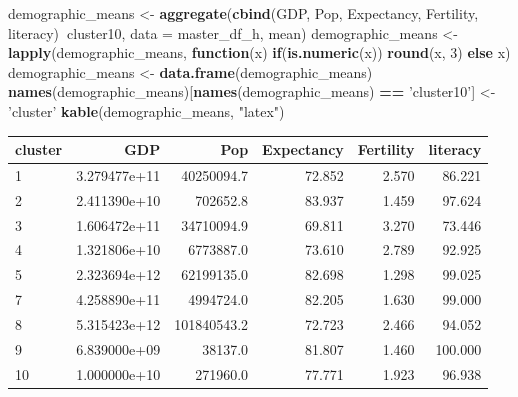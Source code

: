\documentclass[]{article}
\newenvironment{Shaded}{\begin{snugshade}}{\end{snugshade}}
\newcommand{\ControlFlowTok}[1]{\textcolor[rgb]{0.13,0.29,0.53}{\textbf{#1}}}
\newcommand{\DataTypeTok}[1]{\textcolor[rgb]{0.13,0.29,0.53}{#1}}
\newcommand{\DecValTok}[1]{\textcolor[rgb]{0.00,0.00,0.81}{#1}}
\newcommand{\KeywordTok}[1]{\textcolor[rgb]{0.13,0.29,0.53}{\textbf{#1}}}
\newcommand{\NormalTok}[1]{#1}
\newcommand{\OperatorTok}[1]{\textcolor[rgb]{0.81,0.36,0.00}{\textbf{#1}}}
\newcommand{\StringTok}[1]{\textcolor[rgb]{0.31,0.60,0.02}{#1}}
\begin{document}
\begin{Shaded}
\begin{Highlighting}[]
\NormalTok{demographic_means <-}\StringTok{ }\KeywordTok{aggregate}\NormalTok{(}\KeywordTok{cbind}\NormalTok{(GDP, Pop, Expectancy, Fertility, literacy)}\OperatorTok{~}\NormalTok{cluster10, }
                               \DataTypeTok{data =}\NormalTok{ master_df_h, mean)}
\NormalTok{demographic_means <-}\StringTok{ }\KeywordTok{lapply}\NormalTok{(demographic_means, }\ControlFlowTok{function}\NormalTok{(x) }\ControlFlowTok{if}\NormalTok{(}\KeywordTok{is.numeric}\NormalTok{(x)) }\KeywordTok{round}\NormalTok{(x, }\DecValTok{3}\NormalTok{) }\ControlFlowTok{else}\NormalTok{ x)}
\NormalTok{demographic_means <-}\StringTok{ }\KeywordTok{data.frame}\NormalTok{(demographic_means)}
\KeywordTok{names}\NormalTok{(demographic_means)[}\KeywordTok{names}\NormalTok{(demographic_means) }\OperatorTok{==}\StringTok{ 'cluster10'}\NormalTok{] <-}\StringTok{ 'cluster'}
\KeywordTok{kable}\NormalTok{(demographic_means, }\StringTok{"latex"}\NormalTok{)}
\end{Highlighting}
\end{Shaded}

\begin{tabular}{l|r|r|r|r|r}
\hline
cluster & GDP & Pop & Expectancy & Fertility & literacy\\
\hline
1 & 3.279477e+11 & 40250094.7 & 72.852 & 2.570 & 86.221\\
\hline
2 & 2.411390e+10 & 702652.8 & 83.937 & 1.459 & 97.624\\
\hline
3 & 1.606472e+11 & 34710094.9 & 69.811 & 3.270 & 73.446\\
\hline
4 & 1.321806e+10 & 6773887.0 & 73.610 & 2.789 & 92.925\\
\hline
5 & 2.323694e+12 & 62199135.0 & 82.698 & 1.298 & 99.025\\
\hline
7 & 4.258890e+11 & 4994724.0 & 82.205 & 1.630 & 99.000\\
\hline
8 & 5.315423e+12 & 101840543.2 & 72.723 & 2.466 & 94.052\\
\hline
9 & 6.839000e+09 & 38137.0 & 81.807 & 1.460 & 100.000\\
\hline
10 & 1.000000e+10 & 271960.0 & 77.771 & 1.923 & 96.938\\
\hline
\end{tabular}
\end{document}
